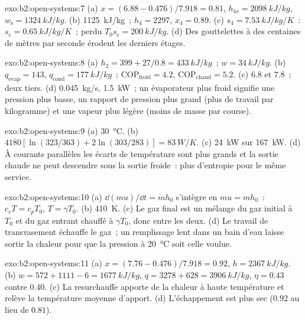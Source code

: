 \begin{solution}{exo:b2:open-systems:7}
(a) $x = (6.88 - 0.476)/7.918 = 0.81$, $h_{4s} = \qty{2098}{kJ/kg}$, $w_{\text{s}} =
\qty{1324}{kJ/kg}$. (b) \qty{1125}{kJ/kg}~; $h_4 = 2297$, $x_4 = 0.89$. (c) $s_4 =
\qty{7.53}{kJ/kg/K}$~: $s_{\text{c}} = \qty{0.65}{kJ/kg/K}$~; perdu $T_0s_{\text{c}} =
\qty{200}{kJ/kg}$. (d) Des gouttelettes à des centaines de mètres par seconde érodent les
derniers étages.
\end{solution}

\begin{solution}{exo:b2:open-systems:8}
(a) $h_2 = 399 + 27/0.8 = \qty{433}{kJ/kg}$~; $w = \qty{34}{kJ/kg}$. (b) $q_{\text{evap}}
= 143$, $q_{\text{cond}} = \qty{177}{kJ/kg}$~; $\mathrm{COP}_{\text{froid}} = 4.2$,
$\mathrm{COP}_{\text{chaud}} = 5.2$. (c) $6.8$ et $7.8$~; deux tiers. (d) \qty{0.045}{kg/s},
\qty{1.5}{kW}~; un évaporateur plus froid signifie une pression plus basse, un
rapport de pression plus grand (plus de travail par kilogramme) et une vapeur plus légère (moins de
masse par course).
\end{solution}

\begin{solution}{exo:b2:open-systems:9}
(a) \qty{30}{\celsius}. (b) $4180[\ln(323/363) + 2\ln(303/283)] = \qty{83}{W/K}$.
(c) \qty{24}{kW} sur \qty{167}{kW}. (d) À courants parallèles les écarts de température sont
plus grands et la sortie chaude ne peut descendre sous la sortie froide~: plus
d'entropie pour le même service.
\end{solution}

\begin{solution}{exo:b2:open-systems:10}
(a) $\dd(mu)/\dd t = \dot m h_0$ s'intègre en $mu = mh_0$~: $c_vT = c_pT_0$,
$T = \gamma T_0$. (b) \qty{410}{K}. (c) Le gaz final est un mélange du
gaz initial à $T_0$ et du gaz entrant chauffé à $\gamma T_0$, donc
entre les deux. (d) Le travail de transvasement échauffe le gaz~; un remplissage lent dans un
bain d'eau laisse sortir la chaleur pour que la pression à \qty{20}{\celsius} soit
celle voulue.
\end{solution}

\begin{solution}{exo:b2:open-systems:11}
(a) $x = (7.76 - 0.476)/7.918 = 0.92$, $h = \qty{2367}{kJ/kg}$. (b) $w = 572 + 1111
- 6 = \qty{1677}{kJ/kg}$, $q = 3278 + 628 = \qty{3906}{kJ/kg}$, $\eta = 0.43$
contre $0.40$. (c) La resurchauffe apporte de la chaleur à haute température et
relève la température moyenne d'apport. (d) L'échappement est plus sec
($0.92$ au lieu de $0.81$).
\end{solution}

